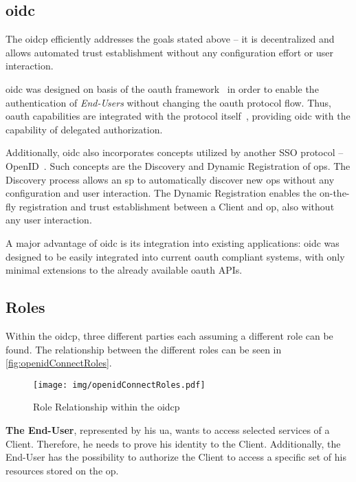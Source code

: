 \documentclass[conference,compsoc]{IEEEtran}
\begin{document}
\subsection{\gls{oidc}}

The \gls{oidcp} efficiently addresses the goals stated above -- it is decentralized and allows automated trust establishment without any configuration effort or user interaction.

\gls{oidc} was designed on basis of the \gls{oauth} framework~\cite{rfc6749oauth} in order to enable the authentication of \textit{End-Users} without changing the \gls{oauth} protocol flow.
Thus, \gls{oauth} capabilities are integrated with the protocol itself~\cite{OpenIDFoundation2014}, providing \gls{oidc} with the capability of delegated authorization.


Additionally, \gls{oidc} also incorporates concepts utilized by another SSO protocol -- OpenID~\cite{oidcVSoid}.
Such concepts are the Discovery and Dynamic Registration of \glspl{op}.
The Discovery process allows an \gls{sp} to automatically discover new \glspl{op} without any configuration and user interaction.
The Dynamic Registration enables the on-the-fly registration and trust establishment between a Client and \gls{op}, also without any user interaction.

A major advantage of \gls{oidc} is its integration into existing applications:
\Gls{oidc} was designed to be easily integrated into current \gls{oauth} compliant systems, with only minimal extensions to the already available \gls{oauth} APIs.


\subsection{Roles}

Within the \gls{oidcp}, three different parties each assuming a different role can be found.
The relationship between the different roles can be seen in \autoref{fig:openidConnectRoles}.

\begin{figure}[!ht]
	\centering
	\texttt{[image: img/openidConnectRoles.pdf]}
	\caption[Role Relationship within the \gls{oidcp}]{Role Relationship within the \gls{oidcp}~\cite[Section 1.3]{OpenIDFoundation2014}}
	\label{fig:openidConnectRoles}
\end{figure}

\textbf{The End-User}, represented by his \gls{ua}, wants to access selected services of a Client.
Therefore, he needs to prove his identity to the Client.
Additionally, the End-User has the possibility to authorize the Client to access a specific set of his resources stored on the \gls{op}.
\end{document}
